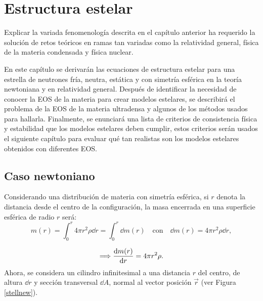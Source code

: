 \chapter{Estructura estelar}


Explicar la variada fenomenología descrita en el capítulo anterior ha requerido la solución de retos teóricos en ramas tan variadas como la relatividad general, física de la materia condensada y física nuclear. 


En este capítulo se derivarán las ecuaciones de estructura estelar para una estrella de neutrones fría, neutra, estática y con simetría esférica en la teoría newtoniana y en relatividad general. Después de identificar la necesidad de conocer la EOS de la materia para crear modelos estelares, se  describirá el problema de la EOS de la materia ultradensa y algunos de los métodos usados para hallarla.
Finalmente, se enunciará una lista de criterios de consistencia física y estabilidad que los modelos estelares deben cumplir, estos criterios serán usados el siguiente capítulo para evaluar qué tan realistas son los modelos estelares obtenidos con diferentes EOS.




\section{Caso newtoniano}

Considerando una distribución de materia con simetría esférica, si $r$ denota la distancia desde el centro de la configuración, la masa encerrada en una superficie esférica de radio $r$ será:  
\begin{equation}
    m ( r ) = \int _ { 0 } ^ { r } 4 \pi r ^ { 2 } \rho \dd{r} = \int_{0}^{r} \dd{m(r)} \quad\text{con}\quad \dd{m(r)}=4\pi r^2\rho \dd{r},
    \label{mN}
\end{equation}

\begin{equation}
    \Longrightarrow\dv{m(r)}{r} =4\pi r^2 \rho.
    \label{dmnewton}
\end{equation}
Ahora, se considera un cilindro infinitesimal a una distancia $r$ del centro, de altura $\dd{r}$ y sección transversal $\dd{A}$, normal al vector posición $\vec{r}$ (ver Figura \ref{stellnew}).  

